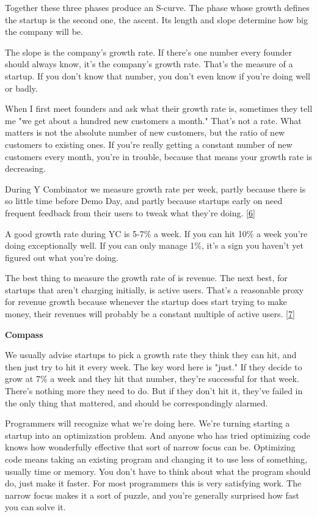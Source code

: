 Together these three phases produce an S-curve.  The phase whose
growth defines the startup is the second one, the ascent.  Its
length and slope determine how big the company will be.

The slope is the company's growth rate.  If there's one number every
founder should always know, it's the company's growth rate.  That's
the measure of a startup.  If you don't know that number, you don't
even know if you're doing well or badly.

When I first meet founders and ask what their growth rate is,
sometimes they tell me "we get about a hundred new customers a
month."  That's not a rate.  What matters is not the absolute number
of new customers, but the ratio of new customers to existing ones.
If you're really getting a constant number of new customers every
month, you're in trouble, because that means your growth rate is
decreasing.

During Y Combinator we measure growth rate per week, partly because
there is so little time before Demo Day, and partly because startups
early on need frequent feedback from their users to tweak what
they're doing. 
[\href{\#f6n}{6}]

A good growth rate during YC is 5-7\% a week.  If you can hit 10\% a
week you're doing exceptionally well.  If you can only manage 1\%,
it's a sign you haven't yet figured out what you're doing.

The best thing to measure the growth rate of is revenue.  The next
best, for startups that aren't charging initially, is active users.
That's a reasonable proxy for revenue growth because whenever the
startup does start trying to make money, their revenues will probably
be a constant multiple of active users. 
[\href{\#f7n}{7}]


\textbf{Compass}

We usually advise startups to pick a growth rate they think they
can hit, and then just try to hit it every week.  The key word here
is "just." If they decide to grow at 7\% a week and they hit that
number, they're successful for that week.  There's nothing more
they need to do.  But if they don't hit it, they've failed in the
only thing that mattered, and should be correspondingly alarmed.

Programmers will recognize what we're doing here.  We're turning
starting a startup into an optimization problem.  And anyone who
has tried optimizing code knows how wonderfully effective that sort
of narrow focus can be.  Optimizing code means taking an existing
program and changing it to use less of something, usually time or
memory.  You don't have to think about what the program should do,
just make it faster.  For most programmers this is very satisfying
work.  The narrow focus makes it a sort of puzzle, and you're
generally surprised how fast you can solve it.

